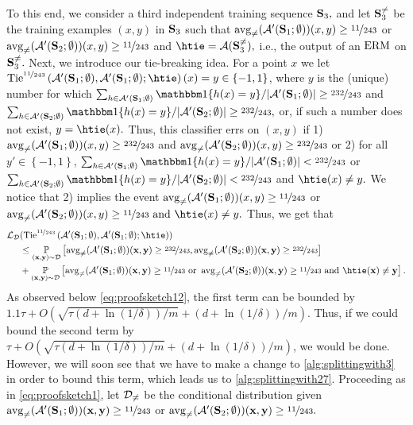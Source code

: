 To this end, we consider a third independent training sequence $ \mathbf{S}_{3},$ and let $ \mathbf{S}_{3}^{\not=} $ be the training examples $ (x,y) $ in $ \mathbf{S}_{3} $ such that $ \operatorname{\mathrm{avg}_{\not=}}( \mathcal{A}'(\mathbf{S}_{1};\emptyset))(x,y)\geq \nicefrac{11}{243} $ or $ \operatorname{\mathrm{avg}_{\not=}}( \mathcal{A}'(\mathbf{S}_{2};\emptyset))(x,y)\geq \nicefrac{11}{243}$ and  $ \htie=\erm(\rS_{3}^{\not=}),$ i.e., the output of an $ \mathrm{ERM} $ on $ \mathbf{S}_{3}^{\not=}.$ Next, we introduce our tie-breaking idea. For a point $ x $ we let $ \tie^{\nicefrac{11}{243}}\left(\cA'(\rS_{1};\emptyset),\cA'(\rS_{1};\emptyset); \htie\right)(x) = y \in \{-1,1\}$, where $y$ is the (unique) number
for which  $ \sum_{h\in \cA'(\rS_{1};\emptyset)}\ind\{h(x)=y\}/|\cA'(\rS_{1};\emptyset)|\geq \nicefrac{232}{243}$ and $\sum_{h\in \cA'(\rS_{2};\emptyset)}\ind\{h(x)=y\}/|\cA'(\rS_{2};\emptyset)|\geq \nicefrac{232}{243},$ or, if such a number does not exist,  $y = \htie(x).$ Thus, this classifier errs on $ (x,y) $ if 1) $ \operatorname{\mathrm{avg}_{\not=}}( \mathcal{A}'(\mathbf{S}_{1};\emptyset))(x,y)\geq \nicefrac{232}{243} $ and $ \operatorname{\mathrm{avg}_{\not=}}( \mathcal{A}'(\mathbf{S}_{2};\emptyset))(x,y)\geq \nicefrac{232}{243}$  or 2) for all $y'\in\left\{  -1,1\right\}$,  $\sum_{h\in \cA'(\rS_{1};\emptyset)}\ind\{h(x)=y\}/|\cA'(\rS_{1};\emptyset)|< \nicefrac{232}{243}$ or $\sum_{h\in \cA'(\rS_{2};\emptyset)}\ind\{h(x)=y\}/|\cA'(\rS_{2};\emptyset)|< \nicefrac{232}{243} $ and $ \htie(x)\not=y.$ We notice that 2) implies the event  $\operatorname{\mathrm{avg}_{\not=}}( \mathcal{A}'(\mathbf{S}_{1};\emptyset))(x,y)\geq \nicefrac{11}{243} $ or $ \avg( \cA'(\rS_{2};\emptyset))(x,y)\geq \nicefrac{11}{243} \text{ and } \htie(x)\not=y.$ Thus,  we get that 
\begin{align}
\ls_{\cD} & (\tie^{\nicefrac{11}{243}}\left(\cA'(\rS_{1};\emptyset),\cA'(\rS_{1};\emptyset); \htie\right))\nonumber
\\
& \leq  
 \p_{(\rx,\ry)\sim \cD}\left[\avg( \cA'(\rS_{1};\emptyset))(\rx,\ry)\geq \nicefrac{232}{243}, \avg( \cA'(\rS_{2};\emptyset))(\rx,\ry)\geq \nicefrac{232}{243}\right]\nonumber
 \\
& +  \p_{(\rx,\ry)\sim \cD}\left[ \avg( \cA'(\rS_{1};\emptyset))(\rx,\ry)\geq \nicefrac{11}{243}\text{ or } \avg( \cA'(\rS_{2};\emptyset))(\rx,\ry)\geq \nicefrac{11}{243} \text{ and } \htie(\rx)\not=\ry\right].\nonumber
\end{align} 
As observed below \cref{eq:proofsketch12}, the first term  can be bounded by $ 1.1\tau+ O(\sqrt{\tau(d+\ln{\left(1/\delta \right)})/m}+(d+\ln{\left(1/\delta \right)})/m)$. Thus, if we could bound the second term by  $\tau+ O(\sqrt{\tau(d+\ln{\left(1/\delta \right)})/m}+(d+\ln{\left(1/\delta \right)})/m)$, we would be done. However, we will soon see that we have to make a change to \cref{alg:splittingwith3} in order to bound this term, which leads us to \cref{alg:splittingwith27}. Proceeding as in \cref{eq:proofsketch1}, let $ \mathcal{D}_{\not=} $ be the conditional distribution given $ \operatorname{\mathrm{avg}_{\not=}}( \mathcal{A}'(\mathbf{S}_{1};\emptyset))(\mathbf{x},\mathbf{y})\geq \nicefrac{11}{243}$ or $ \operatorname{\mathrm{avg}_{\not=}}( \mathcal{A}'(\mathbf{S}_{2};\emptyset))(\mathbf{x},\mathbf{y})\geq \nicefrac{11}{243}.$
